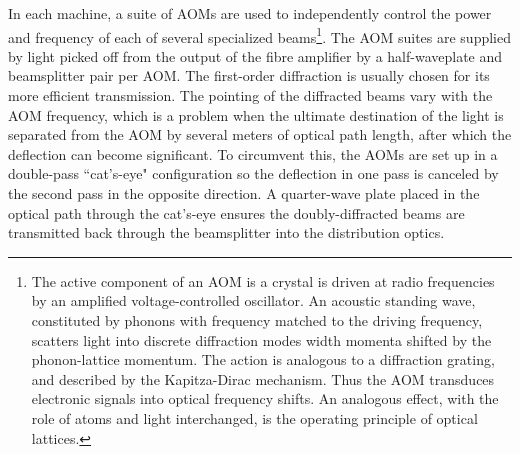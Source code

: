 	



	In each machine, a suite of AOMs are used to independently control the power and frequency of each of several specialized beams\footnote{The active component of an AOM is a crystal is driven at radio frequencies by an amplified voltage-controlled oscillator.	An acoustic standing wave, constituted by phonons with frequency matched to the driving frequency, scatters light into discrete diffraction modes width momenta shifted by the phonon-lattice momentum.	The action is analogous to a diffraction grating, and described by the Kapitza-Dirac mechanism.	Thus the AOM transduces electronic signals into optical frequency shifts.	An analogous effect, with the role of atoms and light interchanged, is the operating principle of optical lattices.}.
	The AOM suites are supplied by light picked off from the output of the fibre amplifier by a half-waveplate and beamsplitter pair per AOM.
	The first-order diffraction is usually chosen for its more efficient transmission.
	The pointing of the diffracted beams vary with the AOM frequency, which is a problem when the ultimate destination of the light is separated from the AOM by several meters of optical path length, after which the deflection can become significant.
	To circumvent this, the AOMs are set up in a double-pass ``cat's-eye" configuration so the deflection in one pass is canceled by the second pass in the opposite direction.
	A quarter-wave plate placed in the optical path through the cat's-eye ensures the doubly-diffracted beams are transmitted back through the beamsplitter into the distribution optics.
	
